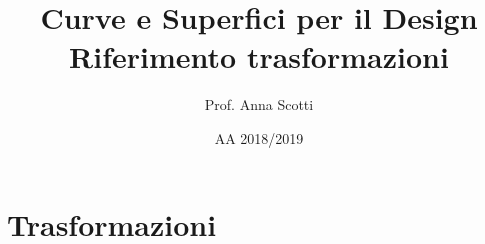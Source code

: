 \documentclass{beamer}
\title[Curve e Sup. - Ref.]{Curve e Superfici per il Design \\ Riferimento trasformazioni}
\author[Prof. Scotti]{Prof. Anna Scotti}
\date{AA 2018/2019}
\begin{document}
\begin{frame}
\maketitle
\end{frame}
\section{Trasformazioni}

\end{document}
